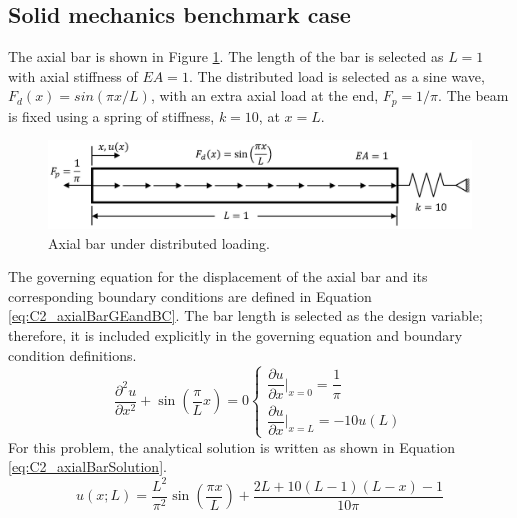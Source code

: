 \subsection{Solid mechanics benchmark case}\label{section:C2_solid_mechanics_benchmark}
The axial bar is shown in Figure \ref{fig:C2_axialBarPhysicalShape}. The length of the bar is selected as $L = 1$ with axial stiffness of $EA = 1$. The distributed load is selected as a sine wave, $F_d(x) = sin(\pi x/L)$, with an extra axial load at the end, $F_p = 1 / \pi$. The beam is fixed using a spring of stiffness, $k = 10$, at $x = L$.
%
\begin{figure}[h]
    \centering
    \includegraphics[width=14.00cm]{Chapter_2/figure/solid_mechanics_benchmark.png}
    \caption{Axial bar under distributed loading.}
    \label{fig:C2_axialBarPhysicalShape}
\end{figure}
%
The governing equation for the displacement of the axial bar and its corresponding boundary conditions are defined in Equation \eqref{eq:C2_axialBarGEandBC}. The bar length is selected as the design variable; therefore, it is included explicitly in the governing equation and boundary condition definitions.
%
\begin{subequations}
\begin{equation}\label{eq:C2_axialBarGE}
    \frac{\partial^2 u}{\partial x^2} + \sin \left( \frac{\pi}{L} x \right) = 0
\end{equation}
\begin{equation}\label{eq:C2_axialBarBC}
    \begin{cases}
    \dfrac{\partial u}{\partial x} \bigg|_{x = 0} = \dfrac{1}{\pi} \\
    \dfrac{\partial u}{\partial x} \bigg|_{x = L} = -10 u(L)
    \end{cases}
\end{equation}
\end{subequations}\label{eq:C2_axialBarGEandBC}
%
For this problem, the analytical solution is written as shown in Equation \eqref{eq:C2_axialBarSolution}.
%
\begin{equation}\label{eq:C2_axialBarSolution}
    u(x; L) = 
    \frac{L^2}{\pi^2} \sin \left( \frac{\pi x}{L} \right) + 
    \frac{2L + 10(L - 1)(L - x) - 1}{10 \pi}
\end{equation}
